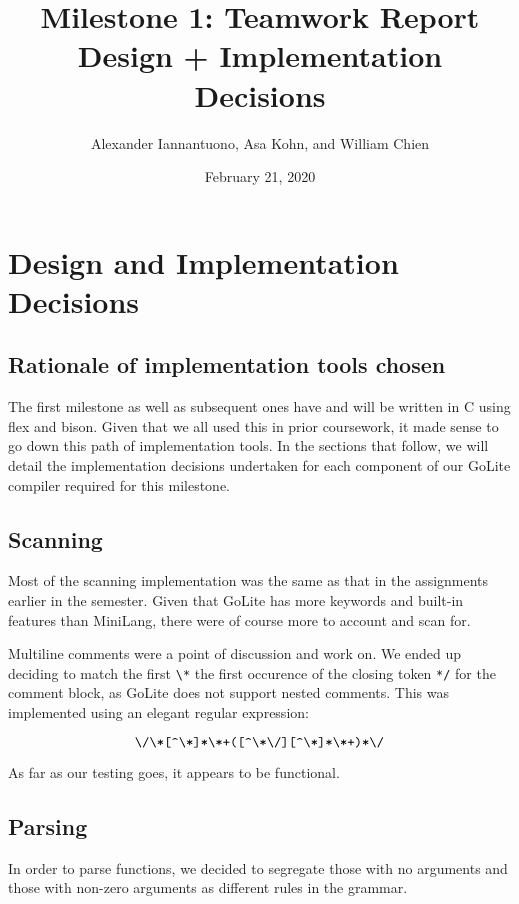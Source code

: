 \documentclass{article}
\title{
    Milestone 1: Teamwork Report\\
    \large Design + Implementation Decisions
}
\author{Alexander Iannantuono, Asa Kohn, and William Chien}
\date{February 21, 2020}
\begin{document}
\maketitle

\section{Design and Implementation Decisions}

\subsection{Rationale of implementation tools chosen}

The first milestone as well as subsequent ones have and will be written in C
using flex and bison. Given that we all used this in prior coursework, it made
sense to go down this path of implementation tools. In the sections
that follow, we will detail the implementation decisions undertaken for each
component of our GoLite compiler required for this milestone.

\subsection{Scanning}

Most of the scanning implementation was the same as that in the assignments earlier in the semester. Given that GoLite has more keywords and built-in features than MiniLang, there were of course more to account and scan for.

Multiline comments were a point of discussion and work on. We ended up deciding to match the first \verb|\*| the first occurence of the closing token \verb|*/| for the comment block, as GoLite does not support nested comments. This was implemented using an elegant regular expression:

\[
    \verb|\/\*[^\*]*\*+([^\*\/][^\*]*\*+)*\/|
\]

As far as our testing goes, it appears to be functional.


\subsection{Parsing}

In order to parse functions, we decided to segregate those with no arguments and those with non-zero arguments as different rules in the grammar.
\end{document}
